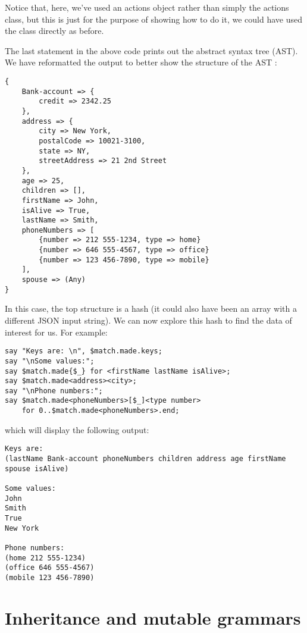 Notice that, here, we've used an actions object rather than 
simply the actions class, but this is just for the purpose of 
showing how to do it, we could have used the class directly 
as before.

The last statement in the above code prints out the abstract syntax 
tree (AST). We have reformatted the output to better show the 
structure of the AST :

\begin{verbatim}
{
    Bank-account => {
        credit => 2342.25
    }, 
    address => {
        city => New York, 
        postalCode => 10021-3100, 
        state => NY, 
        streetAddress => 21 2nd Street
    }, 
    age => 25, 
    children => [], 
    firstName => John, 
    isAlive => True, 
    lastName => Smith, 
    phoneNumbers => [
        {number => 212 555-1234, type => home} 
        {number => 646 555-4567, type => office} 
        {number => 123 456-7890, type => mobile}
    ], 
    spouse => (Any)
}
\end{verbatim}

In this case, the top structure is a hash (it could also have been 
an array with a different JSON input string). We can now explore 
this hash to find the data of interest for us. For example:

\begin{verbatim}
say "Keys are: \n", $match.made.keys;
say "\nSome values:";
say $match.made{$_} for <firstName lastName isAlive>;
say $match.made<address><city>;
say "\nPhone numbers:";
say $match.made<phoneNumbers>[$_]<type number> 
    for 0..$match.made<phoneNumbers>.end;
\end{verbatim}

which will display the following output:

\begin{verbatim}
Keys are:
(lastName Bank-account phoneNumbers children address age firstName spouse isAlive)

Some values:
John
Smith
True
New York

Phone numbers:
(home 212 555-1234)
(office 646 555-4567)
(mobile 123 456-7890)
\end{verbatim}

\section{Inheritance and mutable grammars}

